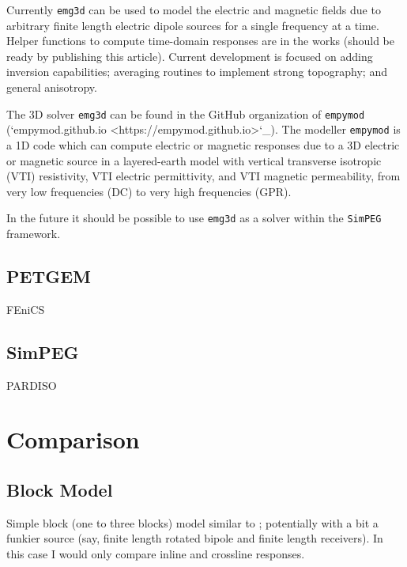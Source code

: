 \documentclass[
    paper,
  ]{geophysics}
\newcommand{\emg}[2]{\texttt{emg#1#2}\xspace}
\newcommand{\empymod}{\texttt{empymod}\xspace}
\newcommand{\simpeg}{\texttt{SimPEG}\xspace}
\begin{document}
Currently \emg3d can be used to model the electric and magnetic fields due to
arbitrary finite length electric dipole sources for a single frequency at a
time. Helper functions to compute time-domain responses are in the works
(should be ready by publishing this article). Current development is focused
on adding inversion capabilities; averaging routines to implement strong
topography; and general anisotropy.

The 3D solver \emg3d can be found in the GitHub organization of \empymod
(`empymod.github.io <https://empymod.github.io>`_). The modeller \empymod
\citep{GEO.17.Werthmuller} is a 1D code which can compute electric or
magnetic responses due to a 3D electric or magnetic source in a layered-earth
model with vertical transverse isotropic (VTI) resistivity, VTI electric
permittivity, and VTI magnetic permeability, from very low frequencies (DC) to
very high frequencies (GPR).

In the future it should be possible to use \emg3d as a solver within the
\simpeg framework.


\subsection{PETGEM}

\cite{GJI.19.CastilloReyes}

FEniCS \citep{CSE.15.Alnaes}


\subsection{SimPEG}

\cite{CAG.15.Cockett}

PARDISO \citep{FGCS.04.Schenk}



\section{Comparison}

\subsection{Block Model}

Simple block (one to three blocks) model similar to \cite{GJI.13.Miensopust};
potentially with a bit a funkier source (say, finite length rotated bipole and
finite length receivers). In this case I would only compare inline and
crossline responses.
\end{document}
